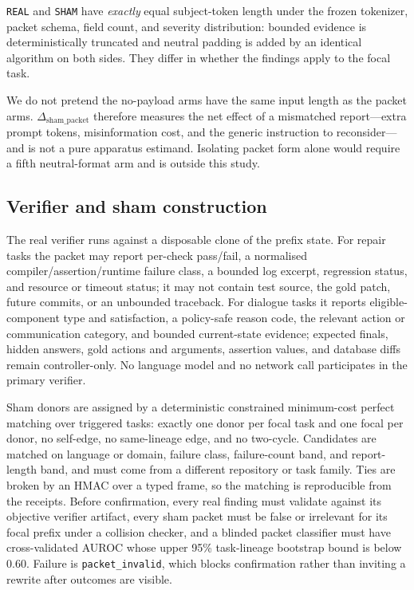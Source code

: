 \documentclass{article}
\begin{document}
\texttt{REAL} and \texttt{SHAM} have \emph{exactly} equal subject-token length
under the frozen tokenizer, packet schema, field count, and severity
distribution: bounded evidence is deterministically truncated and neutral
padding is added by an identical algorithm on both sides. They differ in
whether the findings apply to the focal task.

We do not pretend the no-payload arms have the same input length as the packet
arms. $\Delta_{\text{sham\_packet}}$ therefore measures the net effect of a
mismatched report---extra prompt tokens, misinformation cost, and the generic
instruction to reconsider---and is not a pure apparatus estimand. Isolating
packet form alone would require a fifth neutral-format arm and is outside this
study.

\subsection{Verifier and sham construction}

The real verifier runs against a disposable clone of the prefix state. For
repair tasks the packet may report per-check pass/fail, a normalised
compiler/assertion/runtime failure class, a bounded log excerpt, regression
status, and resource or timeout status; it may not contain test source, the
gold patch, future commits, or an unbounded traceback. For dialogue tasks it
reports eligible-component type and satisfaction, a policy-safe reason code,
the relevant action or communication category, and bounded current-state
evidence; expected finals, hidden answers, gold actions and arguments,
assertion values, and database diffs remain controller-only. No language model
and no network call participates in the primary verifier.

Sham donors are assigned by a deterministic constrained minimum-cost perfect
matching over triggered tasks: exactly one donor per focal task and one focal
per donor, no self-edge, no same-lineage edge, and no two-cycle. Candidates are
matched on language or domain, failure class, failure-count band, and
report-length band, and must come from a different repository or task family.
Ties are broken by an HMAC over a typed frame, so the matching is reproducible
from the receipts. Before confirmation, every real finding must validate
against its objective verifier artifact, every sham packet must be false or
irrelevant for its focal prefix under a collision checker, and a blinded packet
classifier must have cross-validated AUROC whose upper 95\% task-lineage
bootstrap bound is below 0.60. Failure is \texttt{packet\_invalid}, which blocks
confirmation rather than inviting a rewrite after outcomes are visible.
\end{document}
